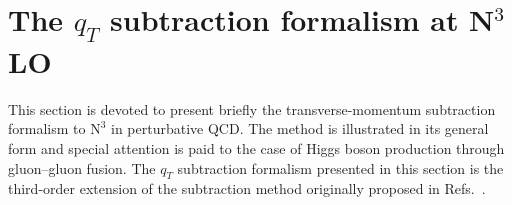 \documentclass[12pt]{article}
\DeclareRobustCommand{\qt}{\ensuremath{q_T}\xspace}
\DeclareRobustCommand{\LO}{\text{LO}\xspace}
\DeclareRobustCommand{\N}[1]{\ensuremath{\text{N}^{#1}}} %
\begin{document}
\section{The \texorpdfstring{$\qt$}{qT} subtraction formalism at \texorpdfstring{N${}^\text{3}$LO}{N3LO}}
\label{sec:forma}

This section is devoted to present briefly the transverse-momentum subtraction formalism to \N3\LO in perturbative QCD. The method is illustrated in its general form and special attention is paid to the case of Higgs boson production through gluon--gluon fusion. The $\qt$ subtraction formalism presented in this section is the third-order extension of the subtraction method originally proposed in Refs.~\cite{Catani:2007vq,Bozzi:2005wk,Bonciani:2015sha}.
\end{document}
